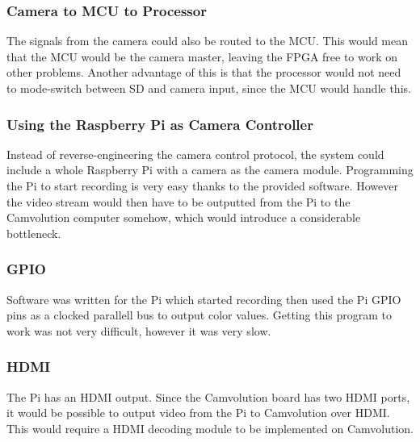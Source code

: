\subsubsection{Camera to MCU to Processor}
The signals from the camera could also be routed to the MCU.
This would mean that the MCU would be the camera master,
leaving the FPGA free to work on other problems.
Another advantage of this is that the processor would not need to mode-switch between SD and camera input,
since the MCU would handle this.

\subsubsection{Using the Raspberry Pi as Camera Controller}
Instead of reverse-engineering the camera control protocol,
the system could include a whole Raspberry Pi with a camera as the camera module.
Programming the Pi to start recording is very easy thanks to the provided software.
However the video stream would then have to be outputted from the Pi to the Camvolution computer somehow,
which would introduce a considerable bottleneck.

\subsubsection{GPIO}
Software was written for the Pi which started recording then used the Pi GPIO pins as a clocked parallell bus to output color values.
Getting this program to work was not very difficult,
however it was very slow.

\subsubsection{HDMI}
The Pi has an HDMI output.
Since the Camvolution board has two HDMI ports,
it would be possible to output video from the Pi to Camvolution over HDMI.
This would require a HDMI decoding module to be implemented on Camvolution.

